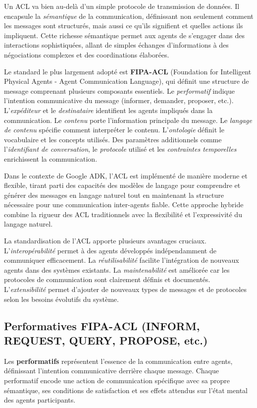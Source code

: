 Un ACL va bien au-delà d'un simple protocole de transmission de données. Il encapsule la \emph{sémantique} de la communication, définissant non seulement comment les messages sont structurés, mais aussi ce qu'ils signifient et quelles actions ils impliquent. Cette richesse sémantique permet aux agents de s'engager dans des interactions sophistiquées, allant de simples échanges d'informations à des négociations complexes et des coordinations élaborées.

Le standard le plus largement adopté est \textbf{FIPA-ACL} (Foundation for Intelligent Physical Agents - Agent Communication Language), qui définit une structure de message comprenant plusieurs composants essentiels. Le \emph{performatif} indique l'intention communicative du message (informer, demander, proposer, etc.). L'\emph{expéditeur} et le \emph{destinataire} identifient les agents impliqués dans la communication. Le \emph{contenu} porte l'information principale du message. Le \emph{langage de contenu} spécifie comment interpréter le contenu. L'\emph{ontologie} définit le vocabulaire et les concepts utilisés. Des paramètres additionnels comme l'\emph{identifiant de conversation}, le \emph{protocole} utilisé et les \emph{contraintes temporelles} enrichissent la communication.

Dans le contexte de Google ADK, l'ACL est implémenté de manière moderne et flexible, tirant parti des capacités des modèles de langage pour comprendre et générer des messages en langage naturel tout en maintenant la structure nécessaire pour une communication inter-agents fiable. Cette approche hybride combine la rigueur des ACL traditionnels avec la flexibilité et l'expressivité du langage naturel.

La standardisation de l'ACL apporte plusieurs avantages cruciaux. L'\emph{interopérabilité} permet à des agents développés indépendamment de communiquer efficacement. La \emph{réutilisabilité} facilite l'intégration de nouveaux agents dans des systèmes existants. La \emph{maintenabilité} est améliorée car les protocoles de communication sont clairement définis et documentés. L'\emph{extensibilité} permet d'ajouter de nouveaux types de messages et de protocoles selon les besoins évolutifs du système.

\subsection{Performatives FIPA-ACL (INFORM, REQUEST, QUERY, PROPOSE, etc.)}

Les \textbf{performatifs} représentent l'essence de la communication entre agents, définissant l'intention communicative derrière chaque message. Chaque performatif encode une action de communication spécifique avec sa propre sémantique, ses conditions de satisfaction et ses effets attendus sur l'état mental des agents participants.

